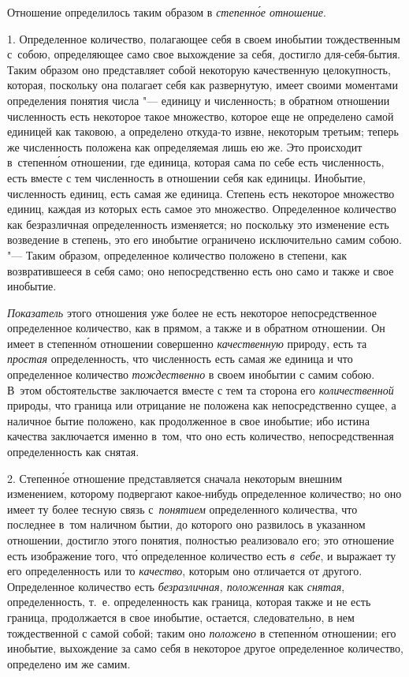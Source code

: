 Отношение определилось таким образом в {\em степенн\'{о}е отношение}.


1. Определенное количество, полагающее себя в своем инобытии тождественным
с~собою, определяющее само свое выхождение за себя, достигло для-себя-бытия.
Таким образом оно представляет собой некоторую качественную целокупность,
которая, поскольку она полагает себя как развернутую, имеет своими моментами
определения понятия числа "--- единицу и численность; в обратном отношении
численность есть некоторое такое множество, которое еще не определено самой
единицей как таковою, а определено откуда-то извне, некоторым третьим; теперь
же численность положена как определяемая лишь ею же. Это происходит
в~степенн\'{о}м отношении, где единица, которая сама по себе есть численность,
есть вместе с тем численность в отношении себя как единицы. Инобытие,
численность единиц, есть самая же единица. Степень есть некоторое множество
единиц, каждая из которых есть самое это множество. Определенное количество как
безразличная определенность изменяется; но поскольку это изменение есть
возведение в степень, это его инобытие ограничено исключительно самим собою.
"--- Таким образом, определенное количество положено в степени, как
возвратившееся в себя само; оно непосредственно есть оно само и также
и свое инобытие.

{\em Показатель} этого отношения уже более не есть некоторое непосредственное
определенное количество, как в прямом, а также и в обратном отношении. Он имеет
в степенн\'{о}м отношении совершенно {\em качественную} природу, есть та
{\em простая} определенность, что численность есть самая же единица и что
определенное количество {\em тождественно} в своем инобытии с самим собою.
В~этом обстоятельстве заключается вместе с тем та сторона его
{\em количественной} природы, что граница или отрицание не положена как
непосредственно сущее, а наличное бытие положено, как продолженное в свое
инобытие; ибо истина качества заключается именно в~том, что оно есть
количество, непосредственная определенность как снятая.

2. Степенн\'{о}е отношение представляется сначала некоторым внешним изменением,
которому подвергают какое-нибудь определенное количество; но оно имеет ту более
тесную связь с~{\em понятием} определенного количества, что последнее в~том
наличном бытии, до которого оно развилось в указанном отношении, достигло этого
понятия, полностью реализовало его; это отношение есть изображение того,
чт\'{о} определенное количество есть {\em в~себе}, и выражает ту его
определенность или то {\em качество}, которым оно отличается от другого.
Определенное количество есть {\em безразличная, положенная} как {\em снятая},
определенность, т.~е. определенность как граница, которая также и не есть
граница, продолжается в свое инобытие, остается, следовательно, в нем
тождественной с самой собой; таким оно {\em положено} в степенн\'{о}м
отношении; его инобытие, выхождение за само себя в некоторое другое
определенное количество, определено им же самим.

